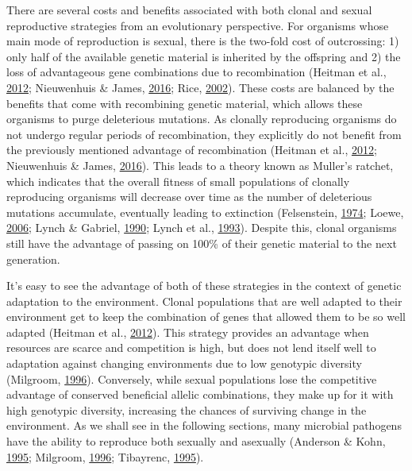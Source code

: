 \documentclass[double,11pt]{beavtex}
\begin{document}
  There are several costs and benefits associated with both clonal and
  sexual reproductive strategies from an evolutionary perspective. For
  organisms whose main mode of reproduction is sexual, there is the
  two-fold cost of outcrossing: 1) only half of the available genetic
  material is inherited by the offspring and 2) the loss of advantageous
  gene combinations due to recombination (Heitman et al.,
  \protect\hyperlink{ref-heitman2012evolution}{2012}; Nieuwenhuis \&
  James, \protect\hyperlink{ref-nieuwenhuis2016frequency}{2016}; Rice,
  \protect\hyperlink{ref-rice2002evolution}{2002}). These costs are
  balanced by the benefits that come with recombining genetic material,
  which allows these organisms to purge deleterious mutations. As clonally
  reproducing organisms do not undergo regular periods of recombination,
  they explicitly do not benefit from the previously mentioned advantage
  of recombination (Heitman et al.,
  \protect\hyperlink{ref-heitman2012evolution}{2012}; Nieuwenhuis \&
  James, \protect\hyperlink{ref-nieuwenhuis2016frequency}{2016}). This
  leads to a theory known as Muller's ratchet, which indicates that the
  overall fitness of small populations of clonally reproducing organisms
  will decrease over time as the number of deleterious mutations
  accumulate, eventually leading to extinction (Felsenstein,
  \protect\hyperlink{ref-felsenstein1974evolutionary}{1974}; Loewe,
  \protect\hyperlink{ref-loewe2006quantifying}{2006}; Lynch \& Gabriel,
  \protect\hyperlink{ref-lynch1990mutation}{1990}; Lynch et al.,
  \protect\hyperlink{ref-lynch1993mutational}{1993}). Despite this, clonal
  organisms still have the advantage of passing on 100\% of their genetic
  material to the next generation.
  
  It's easy to see the advantage of both of these strategies in the
  context of genetic adaptation to the environment. Clonal populations
  that are well adapted to their environment get to keep the combination
  of genes that allowed them to be so well adapted (Heitman et al.,
  \protect\hyperlink{ref-heitman2012evolution}{2012}). This strategy
  provides an advantage when resources are scarce and competition is high,
  but does not lend itself well to adaptation against changing
  environments due to low genotypic diversity (Milgroom,
  \protect\hyperlink{ref-milgroom1996recombination}{1996}). Conversely,
  while sexual populations lose the competitive advantage of conserved
  beneficial allelic combinations, they make up for it with high genotypic
  diversity, increasing the chances of surviving change in the
  environment. As we shall see in the following sections, many microbial
  pathogens have the ability to reproduce both sexually and asexually
  (Anderson \& Kohn, \protect\hyperlink{ref-anderson1995clonality}{1995};
  Milgroom, \protect\hyperlink{ref-milgroom1996recombination}{1996};
  Tibayrenc, \protect\hyperlink{ref-tibayrenc1995population}{1995}).
  
\end{document}
